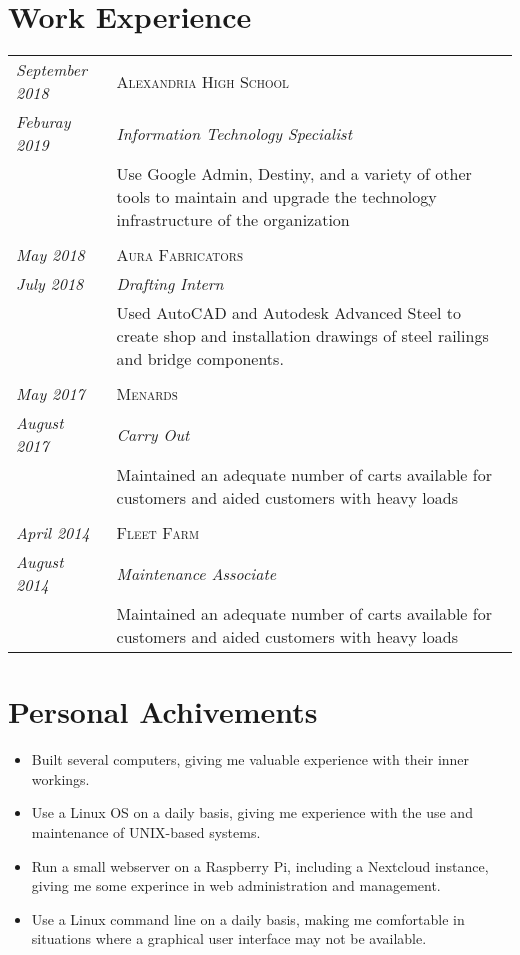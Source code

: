 \documentclass[letterpaper,10pt]{article}
\begin{document}
\section*{Work Experience}
	\begin{tabular}{R{3cm}|p{14cm}}
	\textsl{September 2018}	& \textsc{Alexandria High School}\\
	\textsl{Feburay 2019}	& \emph{Information Technology Specialist}\\
	&\footnotesize{Use Google Admin, Destiny, and a variety of other tools to maintain and upgrade the technology infrastructure of the organization}\\
	\\
	\textsl{May 2018}   & \textsc{Aura Fabricators}\\
	\textsl{July 2018}  & \emph{Drafting Intern}\\
	&\footnotesize{Used AutoCAD and Autodesk Advanced Steel to create shop and installation drawings of steel railings and bridge components.}\\
	\\
	\textsl{May 2017}	  & \textsc{Menards}\\
	\textsl{August 2017}  & \emph{Carry Out}\\
	&\footnotesize{Maintained an adequate number of carts available for customers and aided customers with heavy loads}\\
	\\
	\textsl{April 2014}   & \textsc{Fleet Farm}\\
	\textsl{August 2014}  & \emph{Maintenance Associate}\\
	&\footnotesize{Maintained an adequate number of carts available for customers and aided customers with heavy loads}\\
	\end{tabular}
\newpage
\section*{Personal Achivements}
	\begin{itemize}
	\item Built several computers, giving me valuable experience with their inner workings.
	\item Use a Linux OS on a daily basis, giving me experience with the use and maintenance of UNIX-based systems.
	\item Run a small webserver on a Raspberry Pi, including a Nextcloud instance, giving me some experince in web administration and management.
	\item Use a Linux command line on a daily basis, making me comfortable in situations where a graphical user interface may not be available.
	\end{itemize}
\end{document}
